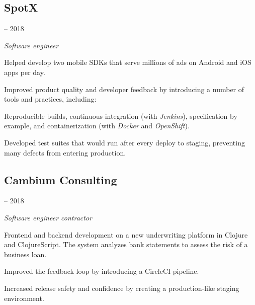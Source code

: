 \noindent\begin{minipage}[t]{0.5\textwidth}
  \subsection*{SpotX}
\end{minipage}
\noindent\begin{minipage}[t]{0.5\textwidth}
   -- 2018
\end{minipage}

\emph{Software engineer}

\begin{itemize}
  {\small
  \item Helped develop two mobile SDKs that serve millions of ads on Android and
    iOS apps per day.
  \item Improved product quality and developer feedback by introducing a number
    of tools and practices, including:

    \begin{adjustwidth}{1em}{0em}
      Reproducible builds, continuous integration (with
      \emph{Jenkins}), specification by example, and containerization (with
      \emph{Docker} and \emph{OpenShift}).
    \end{adjustwidth}

  \item Developed test suites that would run after every deploy to
    staging, preventing many defects from entering production.
  }
\end{itemize}

\begin{minipage}[t]{0.55\textwidth}
  \subsection*{Cambium Consulting}
\end{minipage}
\noindent\begin{minipage}[t]{0.45\textwidth}
   -- 2018
\end{minipage}

\emph{Software engineer contractor}

\begin{itemize}
  {\small
  \item Frontend and backend development on a new underwriting platform in
    Clojure and ClojureScript. The system analyzes bank statements to assess
    the risk of a business loan.
  \item Improved the feedback loop by introducing a CircleCI pipeline.
  \item Increased release safety and confidence by creating a production-like
    staging environment.
  }
\end{itemize}

